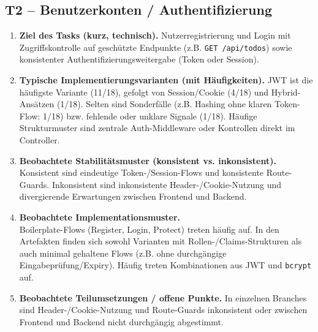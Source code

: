 \subsection*{T2 -- Benutzerkonten / Authentifizierung}
\begin{enumerate}
  \item  \textbf{Ziel des Tasks (kurz, technisch).} Nutzerregistrierung und Login mit Zugriffskontrolle auf geschützte Endpunkte (z.B. \texttt{GET /api/todos}) sowie konsistenter Authentifizierungsweitergabe (Token oder Session).

  \item  \textbf{Typische Implementierungsvarianten (mit Häufigkeiten).} JWT ist die häufigste Variante (11/18), gefolgt von Session/Cookie (4/18) und Hybrid-Ansätzen (1/18). Selten sind Sonderfälle (z.B. Hashing ohne klaren Token-Flow: 1/18) bzw. fehlende oder unklare Signale (1/18). Häufige Strukturmuster sind zentrale Auth-Middleware oder Kontrollen direkt im Controller.

  \item  \textbf{Beobachtete Stabilitätsmuster (konsistent vs. inkonsistent).} Konsistent sind eindeutige Token-/Session-Flows und konsistente Route-Guards. Inkonsistent sind inkonsistente Header-/Cookie-Nutzung und divergierende Erwartungen zwischen Frontend und Backend.

  \item  \textbf{Beobachtete Implementationsmuster.}\\
  Boilerplate-Flows (Register, Login, Protect) treten häufig auf. In den Artefakten finden sich sowohl Varianten mit Rollen-/Claims-Strukturen als auch minimal gehaltene Flows (z.B. ohne durchgängige Eingabeprüfung/Expiry). Häufig treten Kombinationen aus JWT und \texttt{bcrypt} auf.

  \item  \textbf{Beobachtete Teilumsetzungen / offene Punkte.} In einzelnen Branches sind Header-/Cookie-Nutzung und Route-Guards inkonsistent oder zwischen Frontend und Backend nicht durchgängig abgestimmt.
\end{enumerate}

